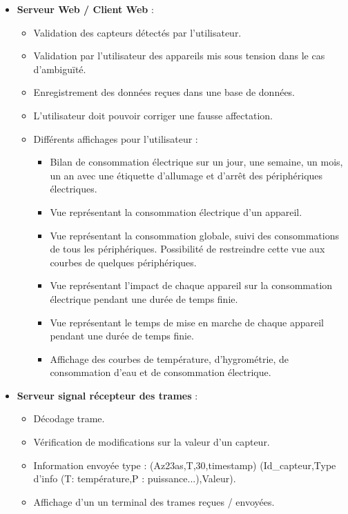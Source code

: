 \documentclass[10pt,a4paper]{article}
\begin{document}
\begin{itemize}
  \item \textbf{Serveur Web / Client Web} :
  \begin{itemize}
    \item Validation des capteurs détectés par l'utilisateur.
    \item Validation par l'utilisateur des appareils mis sous tension dans le cas d'ambiguïté.
    \item Enregistrement des données reçues dans une base de données.
    \item L'utilisateur doit pouvoir corriger une fausse affectation.
    \item Différents affichages pour l'utilisateur :
    \begin{itemize}
      \item Bilan de consommation électrique sur un jour, une semaine, un mois, un an avec une étiquette d'allumage et d'arrêt des périphériques électriques.
      \item Vue représentant la consommation électrique d'un appareil.
      \item Vue représentant la consommation globale, suivi des consommations de tous les périphériques. Possibilité de restreindre cette vue aux courbes de quelques périphériques.
      \item Vue représentant l'impact de chaque appareil sur la consommation électrique pendant une durée de temps finie.
      \item Vue représentant le temps de mise en marche de chaque appareil pendant une durée de temps finie.
      \item Affichage des courbes de température, d'hygrométrie, de consommation d'eau et de consommation électrique.
    \end{itemize}
  \end{itemize}
\end{itemize}

\begin{itemize}
  \item \textbf{Serveur signal récepteur des trames} :
  \begin{itemize}
    \item Décodage trame.
    \item Vérification de modifications sur la valeur d'un capteur.
    \item Information envoyée type : (Az23as,T,30,timestamp) (Id\_capteur,Type d'info (T: température,P : puissance...),Valeur).
    \item Affichage d'un un terminal des trames reçues / envoyées.
  \end{itemize}
\end{itemize}
\end{document}
